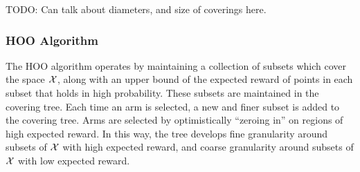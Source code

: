 TODO: Can talk about diameters, and size of coverings here.

\subsubsection{HOO Algorithm}
The HOO algorithm operates by maintaining a collection of subsets
which cover the space ${\mathcal{X}}$, along with an upper bound of the expected
reward of points in each subset that holds in high probability. These
subsets are maintained in the covering tree. Each time an arm is
selected, a new and finer subset is added to the covering tree. Arms
are selected by optimistically ``zeroing in'' on regions of high
expected reward. In this way, the tree develops fine granularity
around subsets of ${\mathcal{X}}$ with high expected reward, and coarse
granularity around subsets of ${\mathcal{X}}$ with low expected reward.


